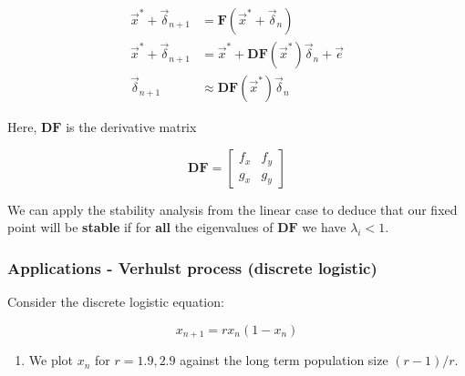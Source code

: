 \documentclass[11pt]{article}
\providecommand{\tightlist}{%
      \setlength{\itemsep}{0pt}\setlength{\parskip}{0pt}}
\begin{document}
\begin{align*}
    \vec{x}^* + \vec{\delta}_{n+1} &= \mathbf{F}(\vec{x}^* + \vec{\delta}_n)\\
    \vec{x}^* + \vec{\delta}_{n+1} &= \vec{x}^* + \mathbf{DF}(\vec{x}^*)\vec{\delta}_n + \vec{e}\\
    \vec{\delta}_{n+1} &\approx \mathbf{DF}(\vec{x}^*)\vec{\delta}_n
\end{align*}

Here, \(\mathbf{DF}\) is the derivative matrix

\begin{equation}
\mathbf{DF} = \begin{bmatrix}f_x&f_y\\g_x&g_y\end{bmatrix}
\end{equation}

We can apply the stability analysis from the linear case to deduce that
our fixed point will be \textbf{stable} if for \textbf{all} the
eigenvalues of \(\mathbf{DF}\) we have \(\lambda_i < 1\).

    \subsubsection{Applications - Verhulst process (discrete
logistic)}\label{applications---verhulst-process-discrete-logistic}

Consider the discrete logistic equation:

\[x_{n+1} = rx_n(1-x_n)\]

\begin{enumerate}
\def\labelenumi{(\alph{enumi})}
\tightlist
\item
  We plot \(x_n\) for \(r = 1.9, 2.9\) against the long term population
  size \((r-1)/r\).
\end{enumerate}
\end{document}
